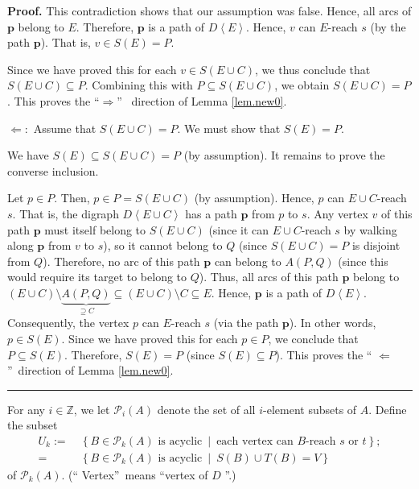 \documentclass[numbers=enddot,12pt,final,onecolumn,notitlepage]{scrartcl}%
\theoremstyle{definition}
\newenvironment{proof}[1][Proof]{\noindent\textbf{#1.} }{\ \rule{0.5em}{0.5em}}
\theoremstyle{plainsl}
\begin{document}
\begin{proof}
This contradiction shows that our assumption was false. Hence, all arcs of
$\mathbf{p}$ belong to $E$. Therefore, $\mathbf{p}$ is a path of
$D\left\langle E\right\rangle $. Hence, $v$ can $E$-reach $s$ (by the path
$\mathbf{p}$). That is, $v\in S\left(  E\right)  =P$.

Since we have proved this for each $v\in S\left(  E\cup C\right)  $, we thus
conclude that $S\left(  E\cup C\right)  \subseteq P$. Combining this with
$P\subseteq S\left(  E\cup C\right)  $, we obtain $S\left(  E\cup C\right)
=P$. This proves the \textquotedblleft$\Longrightarrow$\textquotedblright%
\ direction of Lemma \ref{lem.new0}. \medskip

$\Longleftarrow:$ Assume that $S\left(  E\cup C\right)  =P$. We must show that
$S\left(  E\right)  =P$.

We have $S\left(  E\right)  \subseteq S\left(  E\cup C\right)  =P$ (by
assumption). It remains to prove the converse inclusion.

Let $p\in P$. Then, $p\in P=S\left(  E\cup C\right)  $ (by assumption). Hence,
$p$ can $E\cup C$-reach $s$. That is, the digraph $D\left\langle E\cup
C\right\rangle $ has a path $\mathbf{p}$ from $p$ to $s$. Any vertex $v$ of
this path $\mathbf{p}$ must itself belong to $S\left(  E\cup C\right)  $
(since it can $E\cup C$-reach $s$ by walking along $\mathbf{p}$ from $v$ to
$s$), so it cannot belong to $Q$ (since $S\left(  E\cup C\right)  =P$ is
disjoint from $Q$). Therefore, no arc of this path $\mathbf{p}$ can belong to
$A\left(  P,Q\right)  $ (since this would require its target to belong to
$Q$). Thus, all arcs of this path $\mathbf{p}$ belong to $\left(  E\cup
C\right)  \setminus\underbrace{A\left(  P,Q\right)  }_{\supseteq C}%
\subseteq\left(  E\cup C\right)  \setminus C\subseteq E$. Hence, $\mathbf{p}$
is a path of $D\left\langle E\right\rangle $. Consequently, the vertex $p$ can
$E$-reach $s$ (via the path $\mathbf{p}$). In other words, $p\in S\left(
E\right)  $. Since we have proved this for each $p\in P$, we conclude that
$P\subseteq S\left(  E\right)  $. Therefore, $S\left(  E\right)  =P$ (since
$S\left(  E\right)  \subseteq P$). This proves the \textquotedblleft%
$\Longleftarrow$\textquotedblright\ direction of Lemma \ref{lem.new0}.
\end{proof}

For any $i\in\mathbb{Z}$, we let $\mathcal{P}_{i}\left(  A\right)  $ denote
the set of all $i$-element subsets of $A$. Define the subset%
\begin{align*}
U_{k}:= &  \ \left\{  B\in\mathcal{P}_{k}\left(  A\right)  \text{ is
acyclic}\ \mid\ \text{each vertex can }B\text{-reach }s\text{ or }t\right\}
;\\
= &  \ \left\{  B\in\mathcal{P}_{k}\left(  A\right)  \text{ is acyclic}%
\ \mid\ S\left(  B\right)  \cup T\left(  B\right)  =V\right\}
\end{align*}
of $\mathcal{P}_{k}\left(  A\right)  $. (\textquotedblleft
Vertex\textquotedblright\ means \textquotedblleft vertex of $D$%
\textquotedblright.)
\end{document}

